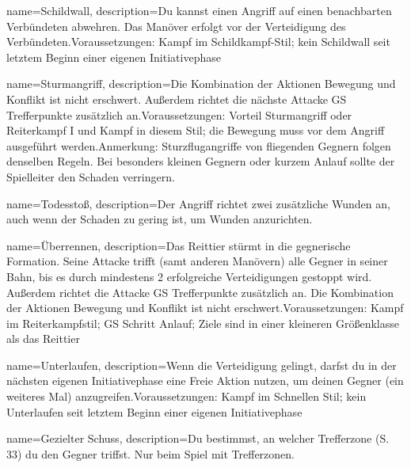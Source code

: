 {
    name={Schildwall},
    description={Du kannst einen Angriff auf einen benachbarten Verbündeten abwehren. Das Manöver erfolgt vor der Verteidigung des Verbündeten.\newline Voraussetzungen: Kampf im Schildkampf-Stil; kein Schildwall seit letztem Beginn einer eigenen Initiativephase}
}


{
    name={Sturmangriff},
    description={Die Kombination der Aktionen Bewegung und Konflikt ist nicht erschwert. Außerdem richtet die nächste Attacke GS Trefferpunkte zusätzlich an.\newline Voraussetzungen: Vorteil Sturmangriff oder Reiterkampf I und Kampf in diesem Stil; die Bewegung muss vor dem Angriff ausgeführt werden.\newline Anmerkung: Sturzflugangriffe von fliegenden Gegnern folgen denselben Regeln. Bei besonders kleinen Gegnern oder kurzem Anlauf sollte der Spielleiter den Schaden verringern.}
}


{
    name={Todesstoß},
    description={Der Angriff richtet zwei zusätzliche Wunden an, auch wenn der Schaden zu gering ist, um Wunden anzurichten.}
}


{
    name={Überrennen},
    description={Das Reittier stürmt in die gegnerische Formation. Seine Attacke trifft (samt anderen Manövern) alle Gegner in seiner Bahn, bis es durch mindestens 2 erfolgreiche Verteidigungen gestoppt wird. Außerdem richtet die Attacke GS Trefferpunkte zusätzlich an. Die Kombination der Aktionen Bewegung und Konflikt ist nicht erschwert.\newline Voraussetzungen: Kampf im Reiterkampfstil; GS Schritt Anlauf; Ziele sind in einer kleineren Größenklasse als das Reittier}
}


{
    name={Unterlaufen},
    description={Wenn die Verteidigung gelingt, darfst du in der nächsten eigenen Initiativephase eine Freie Aktion nutzen, um deinen Gegner (ein weiteres Mal) anzugreifen.\newline Voraussetzungen: Kampf im Schnellen Stil; kein Unterlaufen seit letztem Beginn einer eigenen Initiativephase}
}


{
    name={Gezielter Schuss},
    description={Du bestimmst, an welcher Trefferzone (S. 33) du den Gegner triffst. Nur beim Spiel mit Trefferzonen.}
}


